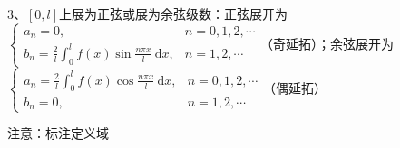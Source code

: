 3、$[0, l]$上展为正弦或展为余弦级数：正弦展开为$\begin{cases}a_{n}=0, & n=0,1,2, \cdots \\ b_{n}=\frac{2}{l} \int_{0}^{l} f(x) \sin \frac{n \pi x}{l} \mathrm{~d} x, & n=1,2, \cdots\end{cases}$（奇延拓）；余弦展开为$\begin{cases}a_{n}=\frac{2}{l} \int_{0}^{l} f(x) \cos \frac{n \pi x}{l} \mathrm{~d} x, & n=0,1,2, \cdots \\ b_{n}=0, & n=1,2, \cdots\end{cases}$（偶延拓）

注意：标注定义域

